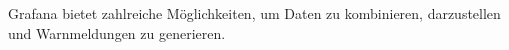 Grafana bietet zahlreiche Möglichkeiten, um Daten zu kombinieren, darzustellen und Warnmeldungen zu generieren. 










